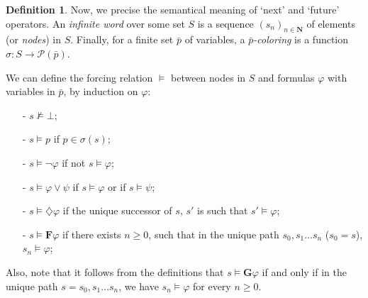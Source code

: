 \documentclass[11pt]{article}
\newcommand{\F}{{\mathbf{F}}}
\newcommand{\phii}{{\varphi}}
\newcommand{\G}{{\mathbf{G}}}
\newcommand{\dia}{{\diamondsuit}}
\theoremstyle{definition}
\newtheorem*{definition}{Definition}
\begin{document}
\begin{definition}\label{infinite word}
    Now, we precise the semantical meaning of `next' and `future' operators.
    An \emph{infinite word} over some set $S$ is a sequence ${(s_n)}_{n\in\mathbf{N}}$ of 
    elements (or \emph{nodes}) in $S$. 
    Finally, for a finite set $\bar{p}$ of
    variables, a \emph{$\bar{p}$-coloring} is a function $\sigma : S \to \mathcal{P}(\bar{p})$.

    We can define the forcing relation $\models$ between nodes in $S$ and formulas $\phii$ with 
    variables in $\bar{p}$, by induction on $\phii$:
    \begin{itemize}
        \setlength\itemsep{0em}
        \item[-] $s\not\models \bot$;
        \item[-] $s \models p$ if $p \in \sigma(s)$;
        \item[-] $s \models \neg\phii$ if not $s \models \phii$;
        \item[-] $s \models \phii \vee \psi$ if $s\models \phii$ or if $s\models \psi$;
        \item[-] $s\models \dia\phii$ if the unique successor of $s$, $s'$ is such that
             $s'\models \phii$;
        \item[-] $s\models \F\phii$ if there exists $n\geq 0$, such that in the unique path 
            $s_0,s_1\ldots s_n$ ($s_0=s$), $s_n\models\phii$;      
    \end{itemize}

\end{definition}

Also, note that it follows from the definitions that $s\models \G\phii$ if and only if in the unique path $s=s_0,s_1\ldots s_n$, we have
$s_n\models\phii$ for every $n\geq 0$.
\end{document}

